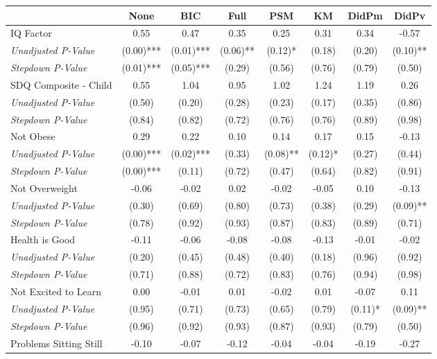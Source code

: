 \begin{tabular}{l c c c c c c c}
\toprule
 & None & BIC & Full & PSM & KM & DidPm & DidPv \\
\midrule
IQ Factor & 0.55 & 0.47 & 0.35 & 0.25 & 0.31 & 0.34 & -0.57 \\
\quad \textit{Unadjusted P-Value} & (0.00)*** & (0.01)*** & (0.06)** & (0.12)* & (0.18) & (0.20) & (0.10)** \\
\quad \textit{Stepdown P-Value} & (0.01)*** & (0.05)*** & (0.29) & (0.56) & (0.76) & (0.79) & (0.50) \\
SDQ Composite - Child & 0.55 & 1.04 & 0.95 & 1.02 & 1.24 & 1.19 & 0.26 \\
\quad \textit{Unadjusted P-Value} & (0.50) & (0.20) & (0.28) & (0.23) & (0.17) & (0.35) & (0.86) \\
\quad \textit{Stepdown P-Value} & (0.84) & (0.82) & (0.72) & (0.76) & (0.76) & (0.89) & (0.98) \\
Not Obese & 0.29 & 0.22 & 0.10 & 0.14 & 0.17 & 0.15 & -0.13 \\
\quad \textit{Unadjusted P-Value} & (0.00)*** & (0.02)*** & (0.33) & (0.08)** & (0.12)* & (0.27) & (0.44) \\
\quad \textit{Stepdown P-Value} & (0.00)*** & (0.11) & (0.72) & (0.47) & (0.64) & (0.82) & (0.91) \\
Not Overweight & -0.06 & -0.02 & 0.02 & -0.02 & -0.05 & 0.10 & -0.13 \\
\quad \textit{Unadjusted P-Value} & (0.30) & (0.69) & (0.80) & (0.73) & (0.38) & (0.29) & (0.09)** \\
\quad \textit{Stepdown P-Value} & (0.78) & (0.92) & (0.93) & (0.87) & (0.83) & (0.89) & (0.71) \\
Health is Good & -0.11 & -0.06 & -0.08 & -0.08 & -0.13 & -0.01 & -0.02 \\
\quad \textit{Unadjusted P-Value} & (0.20) & (0.45) & (0.48) & (0.40) & (0.18) & (0.96) & (0.92) \\
\quad \textit{Stepdown P-Value} & (0.71) & (0.88) & (0.72) & (0.83) & (0.76) & (0.94) & (0.98) \\
Not Excited to Learn & 0.00 & -0.01 & 0.01 & -0.02 & 0.01 & -0.07 & 0.11 \\
\quad \textit{Unadjusted P-Value} & (0.95) & (0.71) & (0.73) & (0.65) & (0.79) & (0.11)* & (0.09)** \\
\quad \textit{Stepdown P-Value} & (0.96) & (0.92) & (0.93) & (0.87) & (0.93) & (0.79) & (0.50) \\
Problems Sitting Still & -0.10 & -0.07 & -0.12 & -0.04 & -0.04 & -0.19 & -0.27 \\

\end{tabular}
